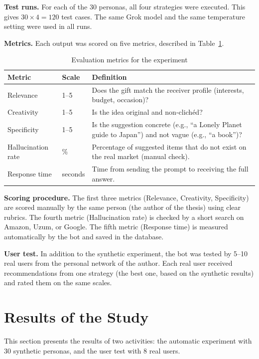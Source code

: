 \textbf{Test runs.} For each of the 30 personas, all four strategies were executed. This gives $30 \times 4 = 120$ test cases. The same Grok model and the same temperature setting were used in all runs.

\textbf{Metrics.} Each output was scored on five metrics, described in Table~\ref{tab:metrics}.

\begin{table}[H]
\centering
\caption{Evaluation metrics for the experiment}
\label{tab:metrics}
\begin{tabular}{p{3cm} p{3cm} p{7cm}}
\toprule
\textbf{Metric} & \textbf{Scale} & \textbf{Definition} \\
\midrule
Relevance & 1--5 & Does the gift match the receiver profile (interests, budget, occasion)? \\
Creativity & 1--5 & Is the idea original and non-clich\'ed? \\
Specificity & 1--5 & Is the suggestion concrete (e.g., ``a Lonely Planet guide to Japan'') and not vague (e.g., ``a book'')? \\
Hallucination rate & \% & Percentage of suggested items that do not exist on the real market (manual check). \\
Response time & seconds & Time from sending the prompt to receiving the full answer. \\
\bottomrule
\end{tabular}
\end{table}

\textbf{Scoring procedure.} The first three metrics (Relevance, Creativity, Specificity) are scored manually by the same person (the author of the thesis) using clear rubrics. The fourth metric (Hallucination rate) is checked by a short search on Amazon, Uzum, or Google. The fifth metric (Response time) is measured automatically by the bot and saved in the database.

\textbf{User test.} In addition to the synthetic experiment, the bot was tested by 5--10 real users from the personal network of the author. Each real user received recommendations from one strategy (the best one, based on the synthetic results) and rated them on the same scales.
\section{Results of the Study}
\label{sec:results}

This section presents the results of two activities: the automatic experiment with 30 synthetic personas, and the user test with 8 real users.

